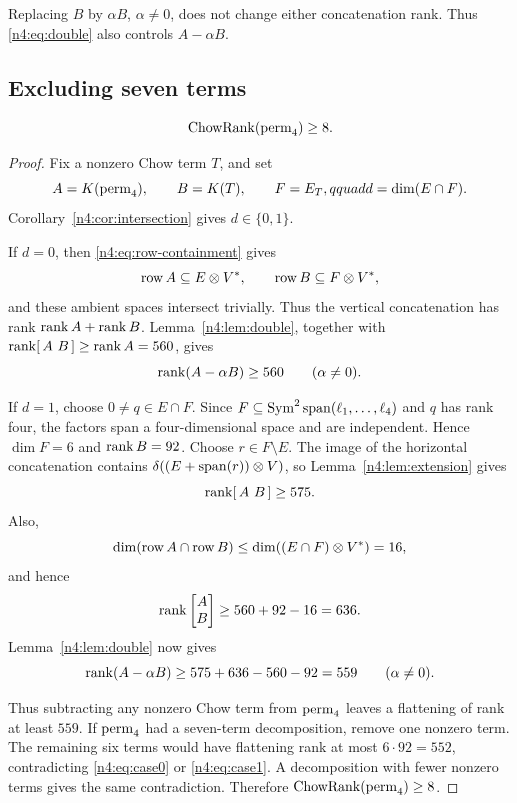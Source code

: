 \begin{remark}\label{n4:rem:scaling}
Replacing \(B\) by \(\alpha B\), \(\alpha\neq0\), does not change either
concatenation rank. Thus \eqref{n4:eq:double} also controls
\(A-\alpha B\).
\end{remark}

\subsection{Excluding seven terms}\label{n4:sec:lower}

\begin{theorem}\label{n4:thm:lower}
\[
  \operatorname{ChowRank}(\operatorname{perm}_4)\geq8.
\]
\end{theorem}

\begin{proof}
Fix a nonzero Chow term \(T\), and set
\[
  A=K(\operatorname{perm}_4),\qquad B=K(T),\qquad
  F=E_T,qquad d=\dim(E\cap F).
\]
Corollary~\ref{n4:cor:intersection} gives \(d\in\{0,1\}\).

If \(d=0\), then \eqref{n4:eq:row-containment} gives
\[
  \operatorname{row} A\subseteq E\otimes V^*,\qquad
  \operatorname{row} B\subseteq F\otimes V^*,
\]
and these ambient spaces intersect trivially. Thus the vertical concatenation
has rank \(\operatorname{rank} A+\operatorname{rank} B\). Lemma~\ref{n4:lem:double}, together with
\(\operatorname{rank}[\,A\ B\,]\geq\operatorname{rank} A=560\), gives
\begin{equation}\label{n4:eq:case0}
  \operatorname{rank}(A-\alpha B)\geq560\qquad(\alpha\neq0).
\end{equation}

If \(d=1\), choose \(0\neq q\in E\cap F\). Since
\(F\subseteq\operatorname{Sym}^2\operatorname{span}(\ell_1,\ldots,\ell_4)\) and \(q\) has rank four,
the factors span a four-dimensional space and are independent. Hence
\(\dim F=6\) and \(\operatorname{rank} B=92\). Choose \(r\in F\setminus E\). The image
of the horizontal concatenation contains
\(\delta((E+\operatorname{span}(r))\otimes V)\), so Lemma~\ref{n4:lem:extension} gives
\begin{equation}\label{n4:eq:horizontal}
  \operatorname{rank}[\,A\ B\,]\geq575.
\end{equation}
Also,
\[
  \dim(\operatorname{row} A\cap\operatorname{row} B)
  \leq\dim((E\cap F)\otimes V^*)=16,
\]
and hence
\begin{equation}\label{n4:eq:vertical}
  \operatorname{rank}\begin{bmatrix}A\\B\end{bmatrix}\geq560+92-16=636.
\end{equation}
Lemma~\ref{n4:lem:double} now gives
\begin{equation}\label{n4:eq:case1}
  \operatorname{rank}(A-\alpha B)\geq575+636-560-92=559
  \qquad(\alpha\neq0).
\end{equation}

Thus subtracting any nonzero Chow term from \(\operatorname{perm}_4\) leaves a flattening
of rank at least \(559\). If \(\operatorname{perm}_4\) had a seven-term decomposition,
remove one nonzero term. The remaining six terms would have flattening rank at
most \(6\cdot92=552\), contradicting \eqref{n4:eq:case0} or
\eqref{n4:eq:case1}. A decomposition with fewer nonzero terms gives the same
contradiction. Therefore \(\operatorname{ChowRank}(\operatorname{perm}_4)\geq8\).
\end{proof}

